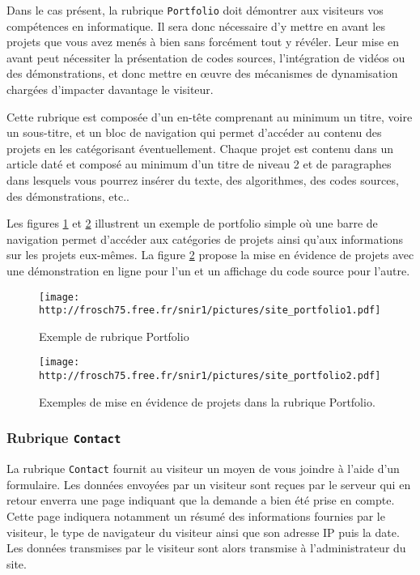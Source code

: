 \documentclass[a4paper,12pt]{article}
\newcommand\Code[1]{\textcolor{couleur_code}{\texttt{#1}}}
\begin{document}
Dans le cas présent, la rubrique \Code{Portfolio} doit démontrer aux visiteurs
vos compétences en informatique. Il sera donc nécessaire d'y mettre en avant 
les projets que vous avez menés à bien sans forcément tout y révéler. Leur mise
en avant peut nécessiter la présentation de codes sources, l'intégration de
vidéos ou des démonstrations, et donc mettre en \oe uvre des mécanismes de 
dynamisation chargées d'impacter davantage le visiteur. 

Cette rubrique est composée d'un en-tête comprenant au minimum un titre, voire
un sous-titre, et un bloc de navigation qui permet d'accéder au contenu des 
projets en les catégorisant éventuellement. 
Chaque projet est contenu dans un article daté et composé au minimum d'un titre
de niveau 2 et de paragraphes dans lesquels vous pourrez insérer du texte, des
algorithmes, des codes sources, des démonstrations, etc..

Les figures \ref{fig:mep6} et \ref{fig:mep7} illustrent un exemple de portfolio
simple où une barre de navigation permet d'accéder aux catégories de projets
ainsi qu'aux informations sur les projets eux-mêmes. 
La figure \ref{fig:mep7} propose la mise en évidence de projets avec une 
démonstration en ligne pour l'un et un affichage du code source pour 
l'autre. 

\begin{figure}[htbp]
  \begin{center}
    \texttt{[image: http://frosch75.free.fr/snir1/pictures/site\_portfolio1.pdf]}
    \caption{Exemple de rubrique \og{}Portfolio\fg{}}
    \label{fig:mep6} 
  \end{center}
\end{figure}

\begin{figure}[htbp]
  \begin{center}
    \texttt{[image: http://frosch75.free.fr/snir1/pictures/site\_portfolio2.pdf]} 
    \caption{Exemples de mise en évidence de projets dans la rubrique 
             \og{}Portfolio\fg{}.}
    \label{fig:mep7} 
  \end{center}
\end{figure}


\subsubsection{Rubrique \Code{Contact}}\label{sec:contact}
La rubrique \Code{Contact} fournit au visiteur un moyen de vous joindre à 
l'aide d'un formulaire. Les données envoyées par un visiteur sont reçues
par le serveur qui en retour enverra une page indiquant que la demande a bien
été prise en compte. Cette page indiquera notamment un résumé des informations  
fournies par le visiteur, le type de navigateur du visiteur ainsi que son
adresse IP puis la date. Les données transmises par le visiteur sont alors
transmise à l'administrateur du site.
\end{document}
